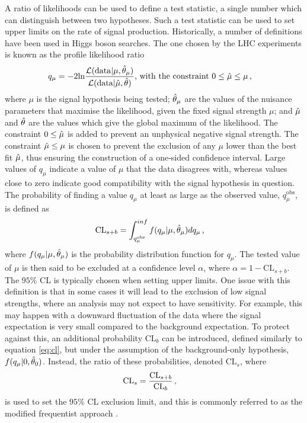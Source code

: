 A ratio of likelihoods can be used to define a test statistic, a single number which can distinguish between two hypotheses. Such a test statistic can be used to set upper limits on the rate of signal production. Historically, a number of definitions have been used in Higgs boson searches. The one chosen by the LHC experiments is known as the profile likelihood ratio
\begin{equation}
    q_{\mu} = -2 \mathrm{ln}\frac{\Lagr(\mathrm{data}| \mu, \Hat{\theta}_{\mu})}{\Lagr(\mathrm{data}|\Hat{\mu},\Hat{\theta})} \text{, with the constraint } 0\leq \Hat{\mu}\leq \mu \msep
\end{equation}
where $\mu$ is the signal hypothesis being tested; $\Hat{\theta}_{\mu}$ are the values of the nuisance parameters that maximise the likelihood, given the fixed signal strength $\mu$; and $\Hat{\mu}$ and $\Hat{\theta}$ are the values which give the global maximum of the likelihood. The constraint $0\leq\Hat{\mu}$ is added to prevent an unphysical negative signal strength. The constraint $\Hat{\mu}\leq\mu$ is chosen to prevent the exclusion of any $\mu$ lower than the best fit $\Hat{\mu}$, thus ensuring the construction of a one-sided confidence interval. Large values of $q_{\mu}$ indicate a value of $\mu$ that the data disagrees with, whereas values close to zero indicate good compatibility with the signal hypothesis in question. The probability of finding a value $q_{\mu}$ at least as large as the observed value, $q_{\mu}^{\mathrm{obs}}$, is defined as
\begin{equation}
    \label{eq:cl}
    \mathrm{CL}_{s+b} = \int^{inf}_{q_{\mu}^{\mathrm{obs}}} f(q_{\mu}|\mu,\Hat{\theta}_{\mu})dq_{\mu} \msep
\end{equation}
where $f(q_{\mu}|\mu,\Hat{\theta}_{\mu})$ is the probability distribution function for $q_{\mu}$. The tested value of $\mu$ is then said to be excluded at a confidence level $\alpha$, where $\alpha = 1 - \mathrm{CL}_{s+b}$. The $95\%$ CL is typically chosen when setting upper limits. One issue with this definition is that in some cases it will lead to the exclusion of low signal strengths, where an analysis may not expect to have sensitivity. For example, this may happen with a downward fluctuation of the data where the signal expectation is very small compared to the background expectation. To protect against this, an additional probability $\mathrm{CL}_b$ can be introduced, defined similarly to equation \ref{eq:cl}, but under the assumption of the background-only hypothesis, $f(q_{\mu}|0,\Hat{\theta}_0)$. Instead, the ratio of these probabilities, denoted $\mathrm{CL}_s$, where
\begin{equation}
    \mathrm{CL}_s = \frac{\mathrm{CL}_{s+b}}{\mathrm{CL}_b}\msep
\end{equation}
is used to set the $95\%$ CL exclusion limit, and this is commonly referred to as the modified frequentist approach \cite{Read_2002}.

